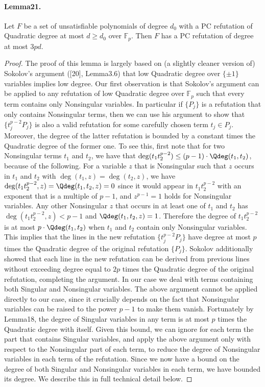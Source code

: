 \paragraph{Lemma21.} Let $F$ be a set of unsatisfiable polynomials of degree $d_0$ with a PC refutation of Quadratic degree at most $d\geq d_0$ over $\mathbb F_p$. Then $F$ has a PC refutation of degree at most $3pd$.
\begin{proof}
The proof of this lemma is largely based on (a slightly cleaner version of) Sokolov's argument ([20], Lemma3.6) that low Quadratic degree over $\{\pm1\}$ variables implies low degree. Our first observation is that Sokolov's argument can be applied to any refutation of low Quadratic degree over $\mathbb F_p$ such that every term contains only Nonsingular variables. In particular if $\{P_j\}$ is a refutation that only contains Nonsingular terms, then we can use his argument to show that $\{t_j^{p-2}P_j\}$ is also a valid refutation for some carefully chosen term $t_j\in P_j$. Moreover, the degree of the latter refutation is bounded by a constant times the Quadratic degree of the former one. To see this, first note that for two Nonsingular terms $t_1$ and $t_2$, we have that $\deg(t_1t_2^{p-2})\leq(p-1)\cdot\Qdeg(t_1,t_2)$, because of the following. For a variable $z$ that is Nonsingular such that $z$ occurs in $t_1$ and $t_2$ with $\deg(t_1,z)=\deg(t_2,z)$, we have $\deg(t_1t_2^{p-2},z)=\Qdeg(t_1,t_2,z)=0$ since it would appear in $t_1t_2^{p-2}$ with an exponent that is a multiple of $p-1$, and $z^{p-1}=1$ holds for Nonsingular variables. Any other Nonsingular $z$ that occurs in at least one of $t_1$ and $t_2$ has $\deg(t_1t_2^{p-2},z)<p-1$ and $\Qdeg(t_1,t_2,z)=1$. Therefore the degree of $t_1t_2^{p-2}$ is at most $p\cdot\Qdeg(t_1,t_2)$ when $t_1$ and $t_2$ contain only Nonsingular variables. This implies that the lines in the new refutation $\{t_j^{p-2}P_j\}$ have degree at most $p$ times the Quadratic degree of the original refutation $\{P_j\}$. Sokolov additionally showed that each line in the new refutation can be derived from previous lines without exceeding degree equal to $2p$ times the Quadratic degree of the original refutation, completing the argument.
In our case we deal with terms containing both Singular and Nonsingular variables. The above argument cannot be applied directly to our case, since it crucially depends on the fact that Nonsingular variables can be raised to the power $p-1$ to make them vanish. Fortunately by Lemma18, the degree of Singular variables in any term is at most $p$ times the Quadratic degree with itself. Given this bound, we can ignore for each term the part that contains Singular variables, and apply the above argument only with respect to the Nonsingular part of each term, to reduce the degree of Nonsingular variables in each term of the refutation. Since we now have a bound on the degree of both Singular and Nonsingular variables in each term, we have bounded its degree. We describe this in full technical detail below.

\end{proof}
